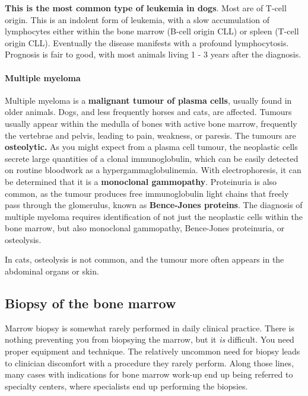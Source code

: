\documentclass[openany]{article}
\let\oldparagraph\paragraph
\renewcommand{\paragraph}[1]{\oldparagraph{#1}\mbox{}}
\begin{document}
\textbf{This is the most common type of leukemia in dogs}. Most are of
T-cell origin. This is an indolent form of leukemia, with a slow
accumulation of lymphocytes either within the bone marrow (B-cell origin
CLL) or spleen (T-cell origin CLL). Eventually the disease manifests
with a profound lymphocytosis. Prognosis is fair to good, with most
animals living 1 - 3 years after the diagnosis.

\paragraph{Multiple myeloma}\label{multiple-myeloma}

Multiple myeloma is a \textbf{malignant tumour of plasma cells}, usually
found in older animals. Dogs, and less frequently horses and cats, are
affected. Tumours usually appear within the medulla of bones with active
bone marrow, frequently the vertebrae and pelvis, leading to pain,
weakness, or paresis. The tumours are \textbf{osteolytic.} As you might
expect from a plasma cell tumour, the neoplastic cells secrete large
quantities of a clonal immunoglobulin, which can be easily detected on
routine bloodwork as a hypergammaglobulinemia. With electrophoresis, it
can be determined that it is a \textbf{monoclonal gammopathy}.
Proteinuria is also common, as the tumour produces free immunoglobulin
light chains that freely pass through the glomerulus, known as
\textbf{Bence-Jones proteins}. The diagnosis of multiple myeloma
requires identification of not just the neoplastic cells within the bone
marrow, but also monoclonal gammopathy, Bence-Jones proteinuria, or
osteolysis.

In cats, osteolysis is not common, and the tumour more often appears in
the abdominal organs or skin.

\hypertarget{biopsy-of-the-bone-marrow}{\subsection{Biopsy of the bone
marrow}\label{biopsy-of-the-bone-marrow}}

Marrow biopsy is somewhat rarely performed in daily clinical practice.
There is nothing preventing you from biopsying the marrow, but it
\emph{is} difficult. You need proper equipment and technique. The
relatively uncommon need for biopsy leads to clinician discomfort with a
procedure they rarely perform. Along those lines, many cases with
indications for bone marrow work-up end up being referred to specialty
centers, where specialists end up performing the biopsies.
\end{document}
